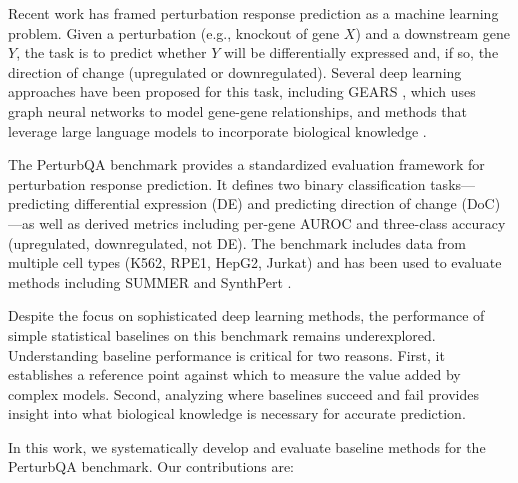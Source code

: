 \documentclass[11pt]{article}
\begin{document}
Recent work has framed perturbation response prediction as a machine learning problem. Given a perturbation (e.g., knockout of gene $X$) and a downstream gene $Y$, the task is to predict whether $Y$ will be differentially expressed and, if so, the direction of change (upregulated or downregulated). Several deep learning approaches have been proposed for this task, including GEARS \citep{roohani2024predicting}, which uses graph neural networks to model gene-gene relationships, and methods that leverage large language models to incorporate biological knowledge \citep{yang2024perturbqa}.

The PerturbQA benchmark \citep{yang2024perturbqa} provides a standardized evaluation framework for perturbation response prediction. It defines two binary classification tasks---predicting differential expression (DE) and predicting direction of change (DoC)---as well as derived metrics including per-gene AUROC and three-class accuracy (upregulated, downregulated, not DE). The benchmark includes data from multiple cell types (K562, RPE1, HepG2, Jurkat) and has been used to evaluate methods including SUMMER \citep{yang2024perturbqa} and SynthPert \citep{anonymous2024synthpert}.

Despite the focus on sophisticated deep learning methods, the performance of simple statistical baselines on this benchmark remains underexplored. Understanding baseline performance is critical for two reasons. First, it establishes a reference point against which to measure the value added by complex models. Second, analyzing where baselines succeed and fail provides insight into what biological knowledge is necessary for accurate prediction.

In this work, we systematically develop and evaluate baseline methods for the PerturbQA benchmark. Our contributions are:
\end{document}
